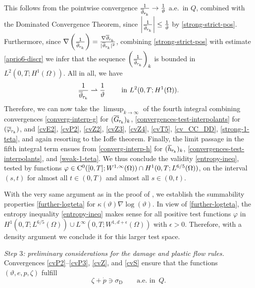 \documentclass[a4paper,10pt,reqno]{amsart}
\numberwithin{equation}{section}
\numberwithin{equation}{section}
\newcommand{\weakto}{\rightharpoonup} %
\newcommand{\aein}{\text{a.e.\ in }}
\newcommand{\teta}{\vartheta}
\newcommand{\piecewiseConstant}[2]{\overline{#1}_{\kern-1pt#2}}
\newcommand{\pwc}{\piecewiseConstant}
\newcommand{\dev}{\mathrm{D}}
\newcommand{\condu}{\kappa}
\newcommand{\EEE}{\color{black}}
\begin{document}
 This follows from the pointwise convergence $\tfrac1{\pwc\teta{\tau_k}} \to \tfrac1\teta$ a.e.\ in $Q$,
 combined with the 
 Dominated Convergence Theorem, since $\left| \tfrac1{\pwc\teta{\tau_k}} \right| \leq \tfrac1{\bar\teta}$ 
 by \eqref{strong-strict-pos}. 
Furthermore, since $\nabla \left( \tfrac1{\pwc\teta{\tau_k}} \right) =
 \tfrac{\nabla  \pwc\teta{\tau_k}}{|\pwc\teta{\tau_k}|^2}$, combining \eqref{strong-strict-pos} with estimate 
 \eqref{aprio6-discr} we infer that the sequence  $\left( \tfrac1{\pwc\teta{\tau_k}} \right)_k$ is  bounded in $L^2(0,T;H^1(\Omega))$. 
 All in all, we have 
  \begin{equation}
 \label{weak-1-teta}
  \frac1{\pwc\teta{\tau_k}} \weakto \frac1\teta \qquad \text{ in } L^2(0,T;H^1(\Omega)). 
\end{equation}
 Therefore, 
we can now  take the $\limsup_{k\to \infty}$ 
of the fourth integral combining convergences
   \eqref{converg-interp-g} for $(\pwc G{\tau_k})_k$, \eqref{convergences-test-interpolants}
   for $(\pwc \varphi{\tau_k})$, and 
    \eqref{cvE2}, \eqref{cvP2}, \eqref{cvZ2}, \eqref{cvZ3}, \eqref{cvZ4}, \eqref{cvT5}, \eqref{cv_CC_DD}, 
 \eqref{strong-1-teta}, and again resorting to the Ioffe theorem. Finally, 
 the limit passage in the fifth integral term ensues from 
 \eqref{converg-interp-h} for $(\pwc h{\tau_k})_k$,  \eqref{convergences-test-interpolants}, and  
 \eqref{weak-1-teta}.  We thus conclude  the validity \eqref{entropy-ineq}, tested by 
 functions  $\varphi \in {\mathrm C}^0 ([0,T]; W^{1,\infty}(\Omega)) \cap H^1(0,T; L^{6/5}(\Omega))$, on the interval $(s,t)$ for almost 
 all $t\in (0,T)$ and almost all $s\in (0,t)$.
 \par
 With the very same argument as in the proof of \cite[Thm.\ 1]{Rossi2016},
  we establish the summability properties  \eqref{further-logteta} for  $\condu(\teta) \nabla \log(\teta)$.
  In view of  \eqref{further-logteta}, the entropy inequality \eqref{entropy-ineq}
   makes sense for all positive test functions
   $\varphi $ in $H^1(0,T; L^{6/5}(\Omega)) \cup L^\infty(0,T;W^{1,d+\epsilon}(\Omega))$ with $\epsilon>0$.
    Therefore, with a density argument we conclude it for this larger test space.%
 \par\noindent 
\emph{Step $3$:  preliminary considerations for the damage and  plastic flow rules.}
  Convergences \eqref{cvP2}--\eqref{cvP3}, \eqref{cvZ}, and \eqref{cvS} ensure that the functions $(\teta, e,p,\zeta)$ fulfill 
\begin{equation}
\label{prelim-flow-rule}
\zeta +\dot p \ni \sigma_\dev \qquad \aein\, Q.
\end{equation}
\end{document}
